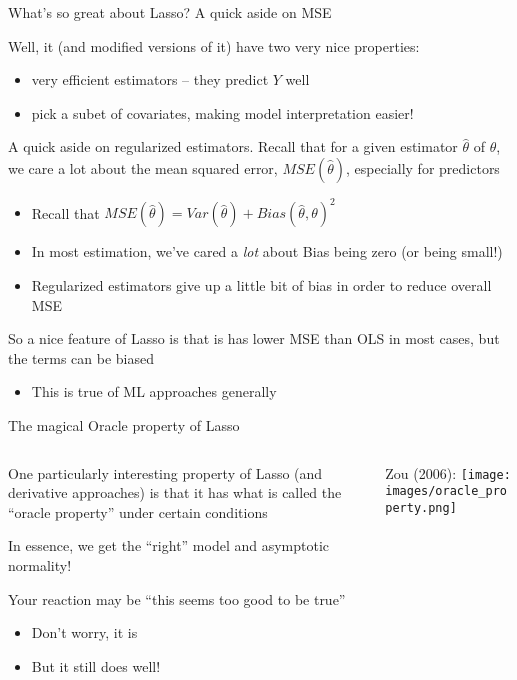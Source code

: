 \documentclass[notes,11pt, aspectratio=169]{beamer}
\newenvironment{wideitemize}{\itemize\addtolength{\itemsep}{10pt}}{\enditemize}
\begin{document}
\begin{frame}{What's so great about Lasso? A quick aside on MSE}
  \begin{wideitemize}
  \item Well, it (and modified versions of it) have two very nice properties:
    \begin{itemize}
    \item very efficient estimators -- they predict $Y$ well
    \item pick a subet of covariates, making model interpretation easier! 
    \end{itemize}
  \item A quick aside on regularized estimators. Recall that for a
    given estimator $\hat{\theta}$ of $\theta$, we care a lot about
    the mean squared error, $MSE(\hat{\theta})$, especially for predictors
    \begin{itemize}
    \item Recall that  $MSE(\hat{\theta}) = Var(\hat{\theta}) + Bias(\hat{\theta}, \theta)^{2}$
    \item In most estimation, we've cared a \emph{lot} about Bias being zero (or being small!)
    \item Regularized estimators give up a little bit of bias in order
      to reduce overall MSE
    \end{itemize}
  \item So a nice feature of Lasso is that is has lower MSE than OLS
    in most cases, but the terms can be biased
    \begin{itemize}
    \item This is true of ML approaches generally
    \end{itemize}
  \end{wideitemize}
\end{frame}


\begin{frame}{The magical Oracle property of Lasso}
  \begin{columns}[T] %
    \begin{column}{.5\textwidth}
  \begin{wideitemize}
  \item One particularly interesting property of Lasso (and derivative
    approaches) is that it has what is called the ``oracle property''
    under certain conditions
  \item In essence, we get the ``right'' model and asymptotic
    normality!
  \item Your reaction may be ``this seems too good to be true''
    \begin{itemize}
    \item Don't worry, it is
    \item But it still does well!
    \end{itemize}
  \end{wideitemize}
    \end{column}%
  \hfill%
  \begin{column}{.5\textwidth}
    Zou (2006):
    \texttt{[image: images/oracle\_property.png]}
  \end{column}
\end{columns}
\end{frame}
\end{document}
